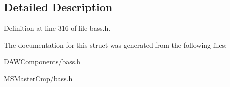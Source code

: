 \subsection{Detailed Description}


Definition at line 316 of file bass.\-h.



The documentation for this struct was generated from the following files\-:\begin{DoxyCompactItemize}
\item 
D\-A\-W\-Components/bass.\-h\item 
M\-S\-Master\-Cmp/bass.\-h\end{DoxyCompactItemize}
